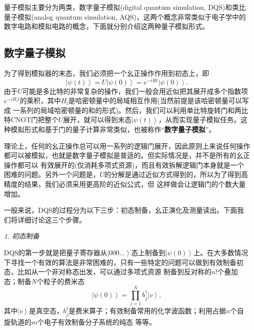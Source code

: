 量子模拟主要分为两类，数字量子模拟(digital quantum simulation, DQS)和类比量子模拟(analog quantum simulation, AQS)，这两个概念非常类似于电子学中的数字电路和模拟电路的概念，下面就分别介绍这两种量子模拟形式。

\subsection{数字量子模拟}

为了得到模拟器的末态，我们必须把一个幺正操作作用到初态上，即
\begin{equation}
         \left\vert \psi(t) \right\rangle = U\left\vert \psi(0) \right\rangle  = e^{-iHt}\left\vert \psi(0) \right\rangle.
 \end{equation}
由于$U$可能是多比特的非常复杂的操作，我们一般会用近似把其展开成多个指数项$e^{-iH_lt}$的乘积，其中$H_l$是哈密顿量中的局域相互作用(当然前提是该哈密顿量可以写成
一系列的局域哈密顿量的和的形式)。然后，我们可以利用单比特旋转门和两比特CNOT门把整个$U$展开，就可以得到末态$\left\vert \psi(t) \right\rangle$，从而实现量子模拟任务。这种模拟形式和基于门的量子计算非常类似，也被称作“\textbf{数字量子模拟}”。

理论上，任何的幺正操作总可以用一系列的逻辑门展开，因此原则上来说任何操作都可以被模拟，也就是数字量子模拟是普适的。但实际情况是，并不是所有的幺正操作都可以
有效展开的(仅消耗多项式资源)，而且有效拆解逻辑门本身就是一个困难的问题。另外一个问题是，$U$的分解是通过近似方式得到的，所以为了得到高精度的结果，我们必须采用更高阶的近似公式，但
这样做会让逻辑门的个数大量增加。

一般来说，DQS的过程分为以下三步：初态制备，幺正演化及测量读出。下面我们将详细讨论这三个步骤\cite{brown}。

\emph{1. 初态制备}

DQS的第一步就是把量子寄存器从$\left\vert 000\ldots \right\rangle$态上制备到$\left\vert \psi(0) \right\rangle$上。在大多数情况下寻找一个有效的算法是非常困难的，只有一些特定的问题可以做到有效制备初态，比如从一个非对称态出发，可以通过多项式资源
制备到反对称的$n!$个叠加态\cite{ini1}；制备$N$个粒子的费米态
\begin{equation}
         \left\vert \psi(0) \right\rangle = \prod_{j=1}^N b_j^{\dagger}\left\vert v \right\rangle,
 \end{equation}
其中$\left\vert v \right\rangle$是真空态，$b_j^{\dagger}$是费米算子\cite{ini2,ini3}；有效制备常用的化学波函数\cite{Polynomial_time_algorithm}；利用占据$n$个自旋轨道的$m$个电子有效制备分子系统的纯态\cite{ini4}
等等。

